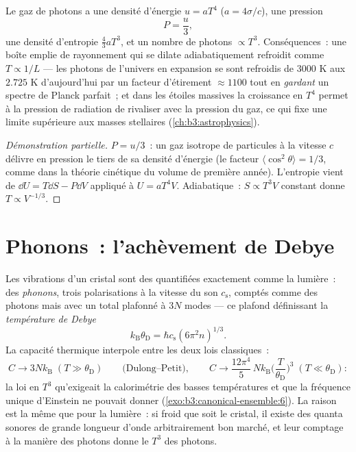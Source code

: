 \begin{proposition}\label{prop:b3:photons-phonons:thermo}
Le gaz de photons a une densité d'énergie $u = aT^4$ ($a =
4\sigma/c$), une pression
\[
P = \frac u3 ,
\]
une densité d'entropie $\tfrac43 aT^3$, et un nombre de photons
$\propto T^3$. Conséquences~: une boîte emplie de rayonnement qui se
dilate adiabatiquement refroidit comme $T \propto 1/L$ --- les
photons de l'univers en expansion se sont refroidis de $3000$ K aux
$2.725$ K d'aujourd'hui par un facteur d'étirement $\approx1100$ tout
en \emph{gardant} un spectre de Planck parfait~; et dans les étoiles
massives la croissance en $T^4$ permet à la pression de radiation de
rivaliser avec la pression du gaz, ce qui fixe une limite supérieure
aux masses stellaires (\cref{ch:b3:astrophysics}).
\end{proposition}

\begin{proof}[Démonstration partielle]
$P = u/3$~: un gaz isotrope de particules à la vitesse $c$ délivre
en pression le tiers de sa densité d'énergie (le facteur $\langle
\cos^2\theta\rangle = 1/3$, comme dans la théorie cinétique du
volume de première année). L'entropie vient de $\dd U = T\dd S - P\dd V$ appliqué à $U =
aT^4V$. Adiabatique~: $S \propto T^3V$ constant donne $T \propto
V^{-1/3}$.
\end{proof}

\section{Phonons~: l'achèvement de Debye}

\begin{theorem}\label{thm:b3:photons-phonons:debye}
Les vibrations d'un cristal sont des  quantifiées
exactement comme la lumière~: des \emph{phonons}, trois
polarisations à la vitesse du son $c_{\text{s}}$, comptés comme des
photons mais avec un total plafonné à $3N$ modes --- ce plafond
définissant la \emph{température de Debye}
\[
k_{\text{B}}\theta_{\text{D}} = \hbar c_{\text{s}}
(6\pi^2n)^{1/3} .
\]
La capacité thermique interpole entre les deux lois classiques~:
\[
C \to 3Nk_{\text{B}} \;(T \gg \theta_{\text{D}})
\qquad\text{(Dulong--Petit)} ,
\qquad
C \to \frac{12\pi^4}{5}\,Nk_{\text{B}}
\Big(\frac{T}{\theta_{\text{D}}}\Big)^3
\;(T \ll \theta_{\text{D}}) :
\]
la loi en $T^3$ qu'exigeait la calorimétrie des basses températures
et que la fréquence unique d'Einstein ne pouvait donner
(\cref{exo:b3:canonical-ensemble:6}). La raison est la même que pour
la lumière~: si froid que soit le cristal, il existe des quanta
sonores de grande longueur d'onde arbitrairement bon marché, et leur
comptage à la manière des photons donne le $T^3$ des photons.
\end{theorem}

